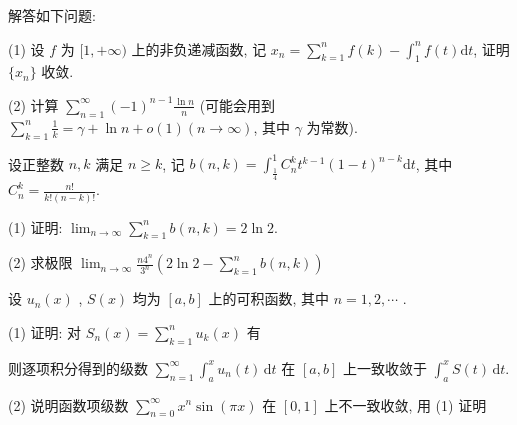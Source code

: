 解答如下问题:\par
(1) 设 $f$ 为 $[1, +\infty)$ 上的非负递减函数, 记 $x_{n} = \sum_{k=1}^{n} f(k) - \int_{1}^{n} f(t) \mathrm{d}t$, 证明 $\{x_{n}\}$ 收敛.\par
(2) 计算 $\sum_{n=1}^{\infty} (-1)^{n-1} \frac{\ln n}{n}$ (可能会用到 $\sum_{k=1}^{n} \frac{1}{k} = \gamma + \ln n + o(1) (n \to \infty)$, 其中 $\gamma$ 为常数).\par
设正整数 $n, k$ 满足 $n \geq k$, 记 $b(n, k) = \int_{\frac{1}{4}}^{1} C_n^k t^{k-1}(1 - t)^{n-k} \mathrm{d}t$, 其中 $C_n^k = \frac{n!}{k!(n-k)!}$.\par
(1) 证明: $\lim_{n\to \infty}\sum_{k = 1}^{n}b(n,k) = 2\ln 2.$\par
(2) 求极限 $\lim_{n\to \infty}\frac{n4^n}{3^n}\left(2\ln 2 - \sum_{k = 1}^n b(n,k)\right)$\par
设  $u_{n}(x)$ ,  $S(x)$  均为  $[a, b]$  上的可积函数, 其中  $n = 1, 2, \cdots$ .\par
\par{}
(1) 证明: 对 $S_{n}(x) = \sum_{k=1}^{n} u_{k}(x)$ 有\par
\nopagebreak[4]
则逐项积分得到的级数 $\sum_{n=1}^{\infty} \int_{a}^{x} u_n(t) \, \mathrm{d}t$ 在 $[a, b]$ 上一致收敛于 $\int_{a}^{x} S(t) \, \mathrm{d}t$.\par
\par{}
(2) 说明函数项级数 $\sum_{n=0}^{\infty} x^n \sin(\pi x)$ 在 $[0,1]$ 上不一致收敛, 用 (1) 证明\par
\nopagebreak[4]
\par{}
